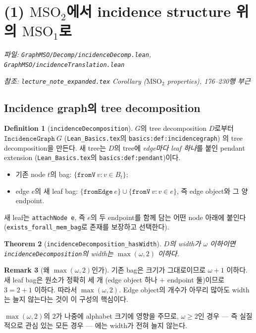 \documentclass[11pt]{article}
\theoremstyle{definition}
\newtheorem{definition}{Definition}[section]
\newtheorem{remark}[definition]{Remark}
\theoremstyle{plain}
\newtheorem{theorem}[definition]{Theorem}
\newcommand{\MSOtwo}{\mathrm{MSO}_2}
\newcommand{\MSOone}{\mathrm{MSO}_1}
\newcommand{\lean}[1]{\texttt{#1}}
\newcommand{\leanfile}[1]{\texttt{#1}}
\begin{document}
\section{(1) \texorpdfstring{$\MSOtwo$}{MSO2}에서 incidence structure 위의 \texorpdfstring{$\MSOone$}{MSO1}로}
\label{mso:sec:incidence}

\emph{파일: \leanfile{GraphMSO/Decomp/incidenceDecomp.lean},
\leanfile{GraphMSO/incidenceTranslation.lean}}

\emph{참조: \leanfile{lecture\_note\_expanded.tex} Corollary
($\MSOtwo$ properties), 176--230행 부근}

\subsection{Incidence graph의 tree decomposition}

\begin{definition}[\lean{incidenceDecomposition}]
\label{mso:def:incidencedecomp}
$G$의 tree decomposition $D$로부터
$\lean{IncidenceGraph}\ G$ (\leanfile{Lean\_Basics.tex}의
\lean{basics:def:incidencegraph}) 의 tree decomposition을 만든다. 새 tree는
$D$의 tree에 \emph{edge마다 leaf 하나}를 붙인 pendant extension
(\leanfile{Lean\_Basics.tex}의 \lean{basics:def:pendant})이다.
\begin{itemize}
  \item 기존 node $t$의 bag: $\{\lean{fromV}\ v : v \in B_t\}$;
  \item edge $e$의 새 leaf bag: $\{\lean{fromEdge}\ e\} \cup \{\lean{fromV}\ v : v \in e\}$,
    즉 edge object와 그 양 endpoint.
\end{itemize}
새 leaf는 \lean{attachNode e}, 즉 $e$의 두 endpoint를 함께 담는 어떤 node
아래에 붙인다 (\lean{exists\_forall\_mem\_bag}로 존재를 보장하고 선택한다).
\end{definition}

\begin{theorem}[\lean{incidenceDecomposition\_hasWidth}]
\label{mso:thm:incidencewidth}
$D$의 width가 $\omega$ 이하이면 \lean{incidenceDecomposition}의 width는
$\max(\omega, 2)$ 이하다.
\end{theorem}

\begin{remark}[왜 $\max(\omega,2)$인가]
기존 bag은 크기가 그대로이므로 $\omega+1$ 이하다. 새 leaf bag은 원소가
정확히 세 개 (edge object 하나 $+$ endpoint 둘)이므로 $3 = 2+1$ 이하다.
따라서 $\max(\omega,2)$. Edge object의 개수가 아무리 많아도 width는 늘지
않는다는 것이 이 구성의 핵심이다.

$\max(\omega,2)$의 $2$가 나중에 alphabet 크기에 영향을 주므로, $\omega \ge 2$인
경우 --- 즉 실질적으로 관심 있는 모든 경우 --- 에는 width가 전혀 늘지 않는다.
\end{remark}
\end{document}
